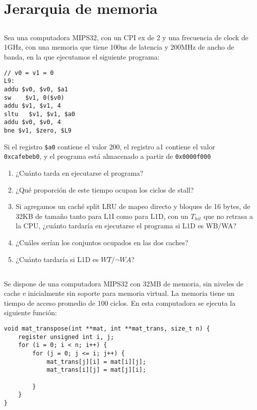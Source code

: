 \section{Jerarquia de memoria}

\subsection{}
Sea una computadora MIPS32, con un CPI ex de 2 y una frecuencia de clock de 1GHz, con una
memoria que tiene 100ns de latencia y 200MHz de ancho de banda, en la que ejecutamos el siguiente
programa:

\begin{verbatim}
// v0 = v1 = 0
L9:
addu $v0, $v0, $a1
sw    $v1, 0($v0)
addu $v1, $v1, 4
sltu   $v1, $v1, $a0
addu $v0, $v0, 4
bne $v1, $zero, $L9
\end{verbatim}

Si el registro \texttt{\$a0} contiene el valor 200, el registro a1 contiene el valor \texttt{0xcafebeb0}, y el programa está almacenado a partir de \texttt{0x0000f000}

\begin{enumerate}[label=\alph*)]
 \item ¿Cuánto tarda en ejecutarse el programa?
 \item ¿Qué proporción de este tiempo ocupan los ciclos de stall?
 \item Si agregamos un caché split LRU de mapeo directo y bloques de 16 bytes, de 32KB de tamaño
tanto para L1I como para L1D, con un $T_{hit}$ que no retrasa a la CPU, ¿cuánto tardaría en
ejecutarse el programa si L1D es WB/WA?
 \item ¿Cuáles serían los conjuntos ocupados en las dos caches?
 \item ¿Cuánto tardaría si L1D es $WT/¬WA$?
\end{enumerate}

\subsection{}
Se dispone de una computadora MIPS32 con 32MB de memoria, sin niveles de cache e inicialmente sin soporte para memoria virtual. La memoria tiene un tiempo de acceso promedio de 100 ciclos. En esta computadora se ejecuta la siguiente función:

\begin{verbatim}
void mat_transpose(int **mat, int **mat_trans, size_t n) {
    register unsigned int i, j;
    for (i = 0; i < n; i++) {
        for (j = 0; j <= i; j++) {
            mat_trans[j][i] = mat[i][j];
            mat_trans[i][j] = mat[j][i];

        }
    }
}
\end{verbatim}

